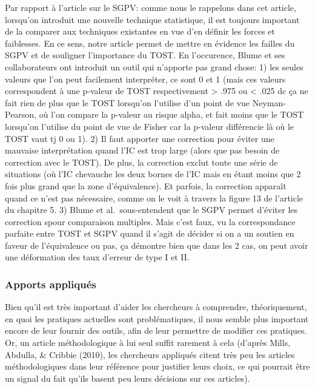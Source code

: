 \documentclass[
  12pt,
  french,
]{article}
\begin{document}
Par rapport à l'article sur le SGPV: comme nous le rappelons dans cet
article, lorsqu'on introduit une nouvelle technique statistique, il est
toujours important de la comparer aux techniques existantes en vue d'en
définir les forces et faiblesses. En ce sens, notre article permet de
mettre en évidence les failles du SGPV et de souligner l'importance du
TOST. En l'occurence, Blume et ses collaborateurs ont introduit un outil
qui n'apporte pas grand chose: 1) les seules valeurs que l'on peut
facilement interpréter, ce sont 0 et 1 (mais ces valeurs correspondent à
une p-valeur de TOST respectivement \textgreater{} .975 ou \textless{}
.025 dc ça ne fait rien de plus que le TOST lorsqu'on l'utilise d'un
point de vue Neyman-Pearson, où l'on compare la p-valeur au risque
alpha, et fait moins que le TOST lorsqu'on l'utilise du point de vue de
Fisher car la p-valeur différencie là où le TOST vaut tj 0 ou 1). 2) Il
faut apporter une correction pour éviter une mauvaise interprétation
quand l'IC est trop large (alors que pas besoin de correction avec le
TOST). De plus, la correction exclut toute une série de situations (où
l'IC chevauche les deux bornes de l'IC mais en étant moins que 2 fois
plus grand que la zone d'équivalence). Et parfois, la correction
apparaît quand ce n'est pas nécessaire, comme on le voit à travers la
figure 13 de l'article du chapitre 5. 3) Blume et al.~sous-entendent que
le SGPV permet d'éviter les correction spour comparaison multiples. Mais
c'est faux, vu la correspondance parfaite entre TOST et SGPV quand il
s'agit de décider si on a un soutien en faveur de l'équivalence ou pas,
ça démontre bien que dans les 2 cas, on peut avoir une déformation des
taux d'erreur de type I et II.

\hypertarget{apports-appliquuxe9s}{%
\subsubsection{Apports appliqués}\label{apports-appliquuxe9s}}

\color{blue} Bien qu'il est très important d'aider les chercheurs à
comprendre, théoriquement, en quoi les pratiques actuelles sont
problématiques, il nous semble plus important encore de leur fournir des
outils, afin de leur permettre de modifier ces pratiques. Or, un article
méthodologique à lui seul suffit rarement à cela (d'après Mills,
Abdulla, \& Cribbie (2010), les chercheurs appliqués citent très peu les
articles méthodologiques dans leur référence pour justifier leurs choix,
ce qui pourrait être un signal du fait qu'ils basent peu leurs décisions
sur ces articles).
\end{document}
